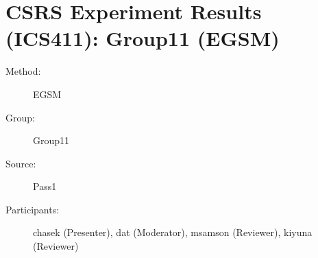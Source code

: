 \chapter {CSRS Experiment Results (ICS411): Group11 (EGSM)}
\small

\begin{description}
\item [Method:] EGSM
\item [Group:] Group11
\item [Source:] Pass1
\item [Participants:] chasek (Presenter), dat (Moderator), msamson (Reviewer), kiyuna (Reviewer)
\end{description}

